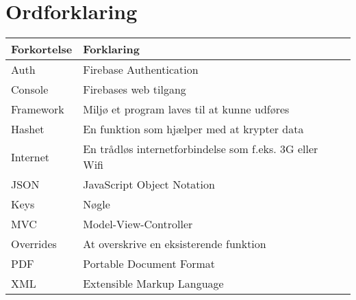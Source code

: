 \chapter*{Ordforklaring}

\begin{tabularx}{\textwidth}{l l X} \hline
	\textbf{Forkortelse}  & \textbf{Forklaring} \\ \hline
	Auth& Firebase Authentication& \\
	Console& Firebases web tilgang& \\
	Framework& Miljø et program laves til at kunne udføres & \\
	Hashet& En funktion som hjælper med at krypter data& \\
	Internet&  En trådløs internetforbindelse som f.eks. 3G eller Wifi& \\
	JSON& JavaScript Object Notation& \\
	Keys& Nøgle&  \\
	MVC& Model-View-Controller& \\
	Overrides& At overskrive en eksisterende funktion& \\
	PDF& Portable Document Format& \\ 
	XML& Extensible Markup Language& \\
	
\end{tabularx}